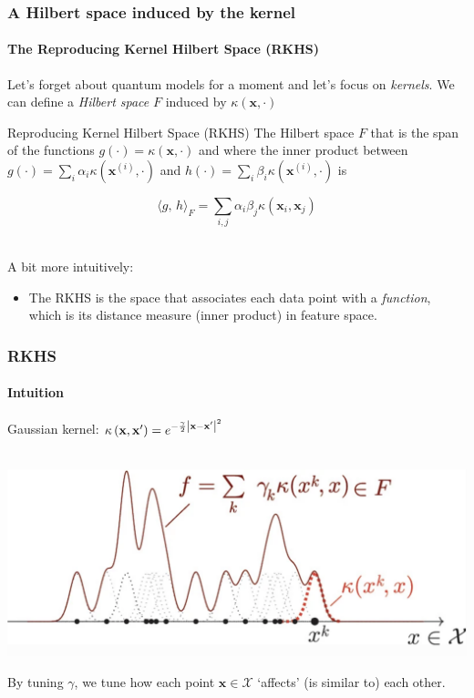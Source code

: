 \documentclass[aspectratio=43]{beamer}
\newcommand{\inner}[2]{\langle #1,\, #2\rangle}
\newcommand{\kernel}[2]{\kappa\left( #1, #2 \right)}
\begin{document}
\begin{frame}
  \frametitle{A Hilbert space induced by the kernel}
  \framesubtitle{The Reproducing Kernel Hilbert Space (RKHS)}
  \pause
  Let's forget about quantum models for a moment and let's focus on \emph{kernels}. We can define a \emph{Hilbert space} $F$ induced by $\kappa\left( \mathbf{x}, \cdot \right)$

  \pause
  \begin{exampleblock}{Reproducing Kernel Hilbert Space (RKHS)}
    The Hilbert space $F$ that is the span of the functions $g(\cdot)=\kappa\left( \mathbf{x}, \cdot\right)$ and where the inner product between $g(\cdot)=\sum_i \alpha_i \kappa\left( \mathbf{x}^{(i)}, \cdot\right)$ and $h(\cdot)=\sum_i \beta_i \kappa\left( \mathbf{x}^{(i)}, \cdot\right)$ is

    \[\inner{g}{h}_F = \sum_{i,j} \alpha_i \beta_j \kappa\left( \mathbf{x}_i, \mathbf{x}_j \right)\]
  \end{exampleblock}

  \ \\
  \pause
  A bit more intuitively:
  \begin{itemize}
    \item The RKHS is the space that associates each data point with a \emph{function}, which is its distance measure (inner product) in feature space.
  \end{itemize}
  
\end{frame}


\begin{frame}
  \frametitle{RKHS}
  \framesubtitle{Intuition}

  Gaussian kernel: $\kernel{\mathbf{x}}{\mathbf{x}^\prime} = e^{-\frac{\gamma}{2}\abs{\mathbf{x}-\mathbf{x}^\prime}^2}$

  \ \\
  \centering
  \includegraphics[width=.5\textwidth]{pics/schuld-rkhs-intuitive.png}

  By tuning $\gamma$, we tune how each point $\mathbf{x}\in \mathcal{X}$ `affects' (is similar to) each other.

\end{frame}
\end{document}

